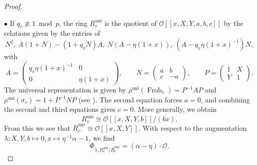 \documentclass[a4paper, notitlepage, 10pt]{amsart}
\theoremstyle{plain} %
\theoremstyle{definition} %
\theoremstyle{remark} %
\numberwithin{equation}{section}
\newcommand{\Frob}{\operatorname{Frob}} %
\newcommand{\uni}{\operatorname{uni}}
\newcommand{\unr}{\operatorname{unr}}
\begin{document}
\begin{proof} $ $

     $\bullet$ If $q_v\not \equiv 1 \bmod p$, the ring $R^{\uni}_v$ is the quotient of $\mathcal{O}[[x,X,Y,a,b,c]]$ by the relations given by the entries of
     $$ N^2, \ A(1+N)-(1+q_vN)A, \ N(A-\eta(1+x)),\ (A-q_v\eta(1+x)^{-1})N, $$
     with
     \begin{equation*}
         A=\begin{pmatrix}
         q_v\eta(1+x)^{-1} & 0 \\ 0 & \eta(1+x)
     \end{pmatrix}, \quad \quad N=\begin{pmatrix}
         a & b \\ c & -a
     \end{pmatrix},\quad \quad P=\begin{pmatrix}
         1 & X \\ Y & 1
     \end{pmatrix}.
     \end{equation*}
     The universal representation is given by $\rho^{\uni}(\Frob_v)=P^{-1}AP$ and $\rho^{\uni}(\sigma_v)=1+P^{-1}NP$ (see \cite[Lemma 5.4]{Sho16}). The second equation forces $a=0$, and combining the second and third equations gives $c=0$. More generally, we obtain 
     $$ R^{\uni}_v\cong \mathcal{O}[[x,X,Y,b]]/(bx).$$
     From this we see that $\overline{R}^{\unr}_v\cong \mathcal{O}[[x,X,Y]]$.
     With respect to the augmentation $\lambda\colon X,Y,b\mapsto 0, x\mapsto \eta^{-1}\alpha-1$, we find
\begin{equation*}
\Phi_{\lambda,R^{\uni}_v/\overline{R}^{\unr}_v}= (\alpha-\eta)\cdot\mathcal{O}.
\end{equation*}  


\end{proof}
\end{document}
